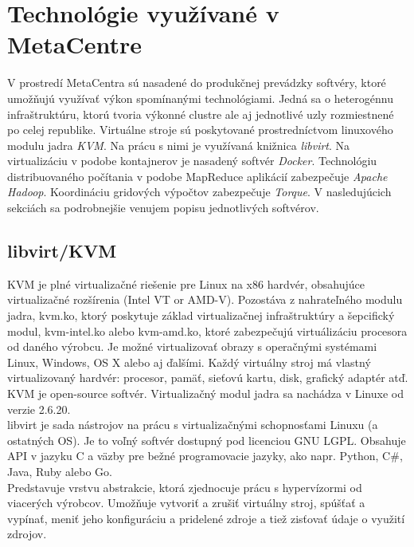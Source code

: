\documentclass[printed,11pt,twoside,color,cover,table]{fithesis3}
\begin{document}
\section{Technológie využívané v MetaCentre}
V prostredí MetaCentra sú nasadené do produkčnej prevádzky softvéry, ktoré umožňujú využívať výkon spomínanými technológiami. Jedná sa o heterogénnu infraštruktúru, ktorú tvoria výkonné clustre ale 
aj jednotlivé uzly rozmiestnené po celej republike. Virtuálne stroje sú poskytované prostredníctvom linuxového modulu jadra \textit{KVM}. Na prácu s nimi je využívaná knižnica \textit{libvirt}. 
Na virtualizáciu v podobe kontajnerov je nasadený softvér \textit{Docker}. Technológiu distribuovaného počítania v podobe MapReduce aplikácií zabezpečuje \textit{Apache Hadoop}.
Koordináciu gridových výpočtov zabezpečuje \textit{Torque}. V nasledujúcich sekciách sa podrobnejšie venujem popisu jednotlivých softvérov.
 
\subsection{libvirt/KVM}
KVM\footnotemark{} je plné virtualizačné riešenie pre Linux na x86 hardvér, obsahujúce virtualizačné rozšírenia (Intel VT or AMD-V).
Pozostáva z nahrateľného modulu jadra, kvm.ko, ktorý poskytuje základ virtualizačnej infraštruktúry a šepcifický modul, kvm-intel.ko alebo kvm-amd.ko, ktoré zabezpečujú virtuálizáciu procesora od daného výrobcu.
Je možné virtualizovať obrazy s operačnými systémami Linux, Windows, OS X alebo aj ďalšími. Každý virtuálny stroj má vlastný virtualizovaný hardvér: procesor, pamäť, sieťovú kartu, disk, grafický adaptér atď. 
KVM je open-source softvér. Virtualizačný modul jadra sa nachádza v Linuxe od verzie 2.6.20.\cite{kvm}
\\libvirt je sada nástrojov na prácu s virtualizačnými schopnosťami Linuxu (a ostatných OS). Je to voľný softvér dostupný pod licenciou GNU LGPL. 
Obsahuje API v jazyku C a väzby pre bežné programovacie jazyky, ako napr. Python, C\#, Java, Ruby alebo Go.\cite{libvirt}
\\Predstavuje vrstvu abstrakcie, ktorá zjednocuje prácu s hypervízormi od viacerých výrobcov. Umožňuje vytvoriť a zrušiť virtuálny stroj, spúšťať a vypínať, meniť jeho konfiguráciu a pridelené zdroje a tiež zisťovať údaje o využití zdrojov.
\end{document}
